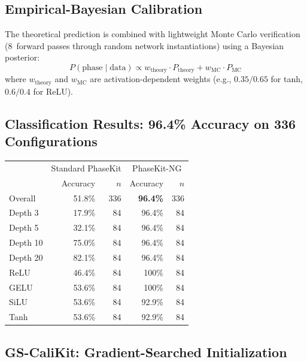 \documentclass[10pt]{article}
\begin{document}
\subsection{Empirical-Bayesian Calibration}

The theoretical prediction is combined with lightweight Monte Carlo verification (8~forward passes through random network instantiations) using a Bayesian posterior:
\begin{equation}
P(\text{phase} \mid \text{data}) \propto w_{\text{theory}} \cdot P_{\text{theory}} + w_{\text{MC}} \cdot P_{\text{MC}}
\end{equation}
where $w_{\text{theory}}$ and $w_{\text{MC}}$ are activation-dependent weights (e.g., $0.35/0.65$ for tanh, $0.6/0.4$ for ReLU).

\subsection{Classification Results: 96.4\% Accuracy on 336 Configurations}

\begin{center}
\begin{tabular}{lrrrr}
\hline
 & \multicolumn{2}{c}{Standard PhaseKit} & \multicolumn{2}{c}{PhaseKit-NG} \\
 & Accuracy & $n$ & Accuracy & $n$ \\
\hline
Overall    & 51.8\% & 336 & \textbf{96.4\%} & 336 \\
\hline
Depth 3    & 17.9\% & 84 & 96.4\% & 84 \\
Depth 5    & 32.1\% & 84 & 96.4\% & 84 \\
Depth 10   & 75.0\% & 84 & 96.4\% & 84 \\
Depth 20   & 82.1\% & 84 & 96.4\% & 84 \\
\hline
ReLU       & 46.4\% & 84 & 100\%  & 84 \\
GELU       & 53.6\% & 84 & 100\%  & 84 \\
SiLU       & 53.6\% & 84 & 92.9\% & 84 \\
Tanh       & 53.6\% & 84 & 92.9\% & 84 \\
\hline
\end{tabular}
\end{center}

\subsection{GS-CaliKit: Gradient-Searched Initialization}
\end{document}
